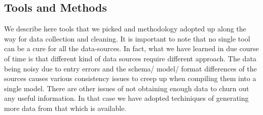 \subsection{Tools and Methods}

We describe here tools that we picked and methodology adopted up along the way for data collection and cleaning. It is important to note that no single tool can be a cure for all the data-sources. In fact, what we have learned in due course of time is that different kind of data sources require different approach.
The data being noisy due to entry errors and the schema/ model/ format differences of the sources causes various consistency issues to creep up when compiling them into a single model.
There are other issues of not obtaining enough data to churn out any useful information. In that case we have adopted techiniques of generating more data from that which is available.

